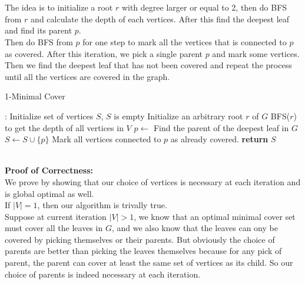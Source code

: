\documentclass[12pt,letterpaper]{article}
\begin{document}
\newpage
\section{}
\subsection{}
The idea is to initialize a root $r$ with degree larger or equal to 2,
then do BFS from $r$ and calculate the depth of each vertices.
After this find the deepest leaf and find its parent $p$.\\
Then do BFS from $p$ for one step to mark all the vertices that is connected to $p$ as covered.
After this iteration, we pick a single parent $p$ and mark some vertices.\\
Then we find the deepest leaf that has not been covered and repeat the process
until all the vertices are covered in the graph.\\
\begin{algorithm}
  \caption{1-Minimal Cover}\label{alg:1cover}
  \begin{algorithmic}[1]
  :
  \State Initialize set of vertices $S$, $S$ is empty
  \State Initialize an arbitrary root $r$ of $G$ 
  \State BFS($r$) to get the depth of all vertices in $V$
  \State $p\gets$ Find the parent of the deepest leaf in $G$
  \State $S\gets S\cup\{p\}$
  \State Mark all vertices connected to $p$ as already covered.
  \EndWhile
  \State \textbf{return} $S$
  \EndProcedure
  \end{algorithmic}
\end{algorithm}\\
\textbf{Proof of Correctness:}\\
We prove by showing that our choice of vertices is necessary at each iteration 
and is global optimal as well.\\
If $|V|=1$, then our algorithm is trivally true.\\
Suppose at current iteration $|V|>1$, 
we know that an optimal minimal cover set must cover all the leaves in $G$,
and we also know that the leaves can ony be covered by picking themselves or their parents.
But obviously the choice of parents are better than picking the leaves themselves 
because for any pick of parent, 
the parent can cover at least the same set of vertices as its child.
So our choice of parents is indeed necessary at each iteration.\\
\end{document}
